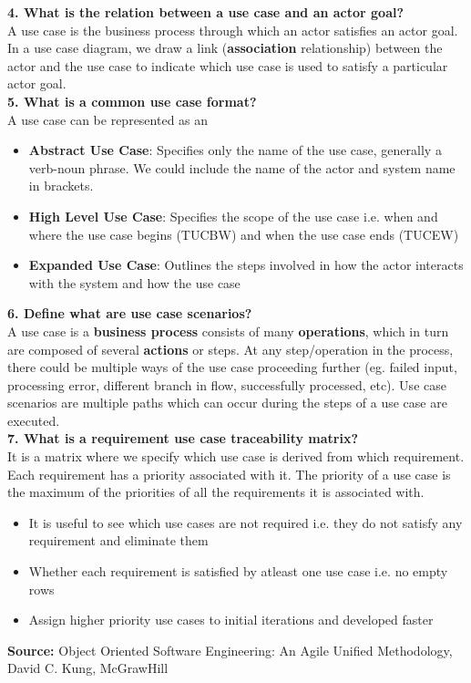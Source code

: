 \documentclass[12pt,letterpaper,titlepage,en-US]{article}
\begin{document}
    \textbf{4. What is the relation between a use case and an actor goal?}\\
    A use case is the business process through which an actor satisfies an actor goal. In a use case diagram, we draw a link (\textbf{association} relationship) between the actor and the use case to indicate which use case is used to satisfy a particular actor goal.\\    
        
        
        
   \textbf{5. What is a common use case format? }\\
  A use case can be represented as an
  
  \begin{itemize}[noitemsep,nolistsep]
  \item \textbf{Abstract Use Case}: Specifies only the name of the use case, generally a verb-noun phrase. We could include the name of the actor and system name in brackets.
  \item \textbf{High Level Use Case}: Specifies the scope of the use case i.e. when and where the use case begins (TUCBW) and when the use case ends (TUCEW)
  \item  \textbf{Expanded Use Case}: Outlines the steps involved in how the actor interacts with the system and how the use case \\
  \end{itemize}
  
\textbf{6.	Define what are use case scenarios? }\\
A use case is a \textbf{business process} consists of many \textbf{operations}, which in turn are composed of several \textbf{actions} or steps. At any step/operation in the process, there could be multiple ways of the use case proceeding further (eg. failed input, processing error, different branch in flow, successfully processed, etc). Use case scenarios are multiple paths which can occur during the steps of a use case are executed. \\

    
    
    
    \textbf{7. What is a requirement use case traceability matrix?}\\
    It is a matrix where we specify which use case is derived from which requirement. Each requirement has a priority associated with it. The priority of a use case is the maximum of the priorities of all the requirements it is associated with.
    \begin{itemize}[noitemsep,nolistsep]
    \item It is useful to see which use cases are not required i.e. they do not satisfy any requirement and eliminate them 
    \item Whether each requirement is satisfied by atleast one use case i.e. no empty rows
    \item Assign higher priority use cases to initial iterations and developed faster\\
    \end{itemize}
    
    


\textbf{Source:} Object Oriented Software Engineering: An Agile Unified Methodology, David C. Kung, McGrawHill
\end{document}
